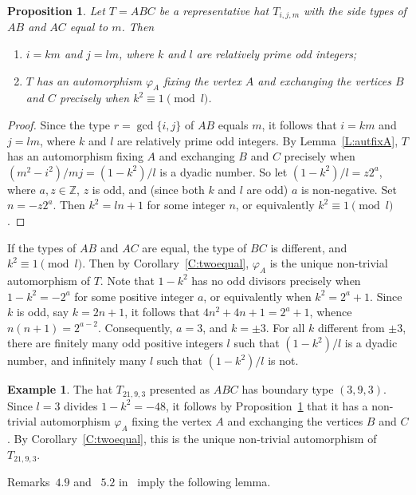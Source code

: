 \documentclass[12pt]{amsart}
\def\p{\varphi}
\def\mbZ{\mathbb{Z}}
\theoremstyle{plain}
\newtheorem{proposition}[theorem]{Proposition}
\theoremstyle{definition}
\newtheorem{example}[theorem]{Example}
\numberwithin{equation}{section}
\begin{document}
\begin{proposition}\label{C:msm}
Let $T = ABC$ be a representative hat $T_{i,j,m}$ with the side types of $AB$ and $AC$ equal to $m$. Then
\begin{enumerate}
\item[(a)] $i = km$ and $j = lm$, where $k$ and $l$ are relatively prime odd integers;
\item[(b)] $T$ has an automorphism $\p_A$ fixing the vertex $A$ and exchanging the vertices
    $B$ and $C$ precisely when $k^2 \equiv 1 \pmod{l}$.
\end{enumerate}
\end{proposition}
\begin{proof}
Since the type $r = \gcd\{i,j\}$ of $AB$ equals $m$, it follows that $i = km$ and $j = lm$,
where $k$ and $l$ are relatively prime odd integers. By Lemma~\ref{L:autfixA}, $T$ has an
automorphism fixing $A$ and exchanging $B$ and $C$ precisely when $(m^2 - i^2)/mj = (1 - k^2)/l$ is a dyadic number. So let $(1 - k^2)/l = z 2^a$, where $a, z \in \mbZ$, $z$ is odd, and (since both $k$ and $l$ are odd) $a$ is non-negative. Set $n = - z2^a$. Then $k^2 = ln +1$ for some integer $n$, or equivalently $k^2 \equiv 1 \pmod{l}$.
\end{proof}

If the types of $AB$ and $AC$ are equal, the type of $BC$ is different, and $k^2 \equiv 1 \pmod{l}$. Then by Corollary~\ref{C:twoequal}, $\p_A$ is the unique non-trivial automorphism of $T$. Note that $1-k^2$ has no odd divisors precisely when $1-k^2 = -2^a$ for some positive integer $a$, or equivalently when $k^2 = 2^a + 1$. Since $k$ is odd, say $k = 2n + 1$, it follows that $4n^2 + 4n + 1 = 2^a + 1$, whence $n(n+1) = 2^{a-2}$.
Consequently, $a = 3$, and $k = \pm3$. For all $k$ different from $\pm3$, there are finitely
many odd positive integers $l$ such that $(1 - k^2)/l$ is a dyadic number, and infinitely many
$l$ such that $(1 - k^2)/l$ is not.



\begin{example}
The hat $T_{21,9,3}$ presented as $ABC$ has boundary type $(3,9,3)$. Since $l = 3$ divides
$1-k^2 = -48$, it follows by Proposition~\ref{C:msm} that it has a non-trivial automorphism $\p_A$ fixing the vertex $A$ and exchanging the vertices $B$ and $C$. By Corollary~\ref{C:twoequal}, this is the
unique non-trivial automorphism of $T_{21,9,3}$.
\end{example}


Remarks~$4.9$ and ~$5.2$ in~\cite{MR25} imply the following lemma.
\end{document}
